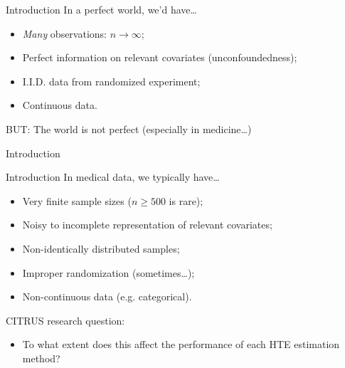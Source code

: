 \documentclass[11pt]{beamer}
\begin{document}
\begin{frame}{Introduction}
In a \alert{perfect} world, we'd have\dots \bigskip

\begin{itemize}\setlength\itemsep{1em}
	\item \textit{Many} observations: $n \to \infty$;
	\item Perfect information on relevant covariates (unconfoundedness);
	\item I.I.D. data from randomized experiment;
	\item Continuous data.
\end{itemize}

\bigskip
BUT: The world is \alert{not} perfect (especially in medicine\dots)
\end{frame}


\begin{frame}{Introduction}
	\begin{figure}
	\end{figure}
\end{frame}


\begin{frame}{Introduction}
In medical data, we typically have\dots \bigskip

\begin{itemize}\setlength\itemsep{1em}
	\item Very finite sample sizes ($n\geq 500$ is rare); 
	\item Noisy to incomplete representation of relevant covariates;
	\item Non-identically distributed samples;
	\item Improper randomization (sometimes\dots);
	\item Non-continuous data (e.g. categorical).
\end{itemize}
\bigskip

\alert{CITRUS research question:}
\begin{itemize}
	\item To what extent does this affect the performance of each HTE estimation method?
\end{itemize}
\end{frame}
\end{document}
